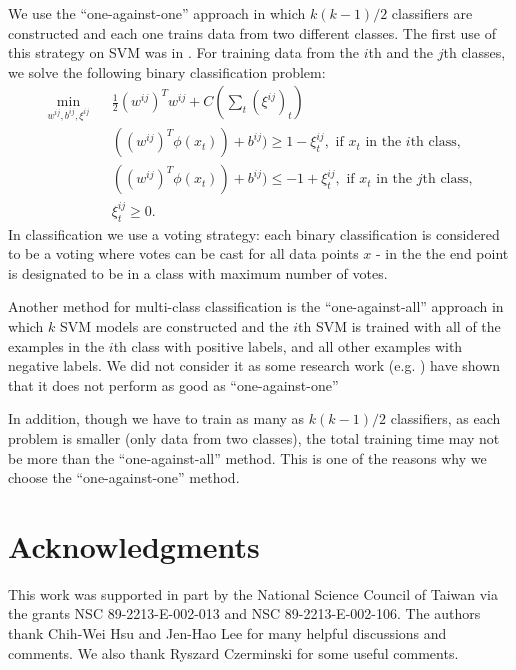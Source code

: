 \documentclass[11pt]{article}
\theoremstyle{break}
\begin{document}
We use the ``one-against-one'' approach
 in which 
$k(k-1)/2$ classifiers 
are constructed and
each one trains data from
two different classes.
The first use of this strategy
on SVM was in
.
For training data from the $i$th
 and the $j$th classes, we solve
the following binary classification
problem:
  \begin{eqnarray*}
\min_{w^{ij}, b^{ij}, \xi^{ij}} && 
\frac{1}{2}(w^{ij})^T w^{ij} + 
C(\sum_{t} (\xi^{ij})_t) 
\nonumber \\
&& ((w^{ij})^T \phi(x_t)) + b^{ij}) 
\geq 1 - \xi^{ij}_t,  
\mbox{ if $x_t$ in the $i$th class,} \nonumber \\
&& ((w^{ij})^T \phi(x_t)) + b^{ij}) 
\leq -1 + \xi^{ij}_t,  
\mbox{ if $x_t$ in the $j$th class,} \nonumber \\
&& \xi^{ij}_t \geq 0.
\nonumber
  \end{eqnarray*}
In classification we use a voting
strategy:
each binary classification
is considered to be a voting where votes can be cast for all data
points $x$ - in the the end point is designated to be in a class
with maximum number of votes.

Another method for multi-class classification
is the ``one-against-all''
approach in which $k$
SVM models are constructed and
the $i$th SVM is trained with
all of the examples
in the $i$th class with
positive labels,
and all other examples with negative labels.
We did not consider it
as some research work (e.g. )
have shown that it 
does not perform as good as ``one-against-one''

In addition, though we have to train 
as many as $k(k-1)/2$
classifiers,
as each problem is smaller
(only data from two classes), the total
training time may not be more than
the ``one-against-all'' method.
This is one of the reasons why we choose
the ``one-against-one'' method.


\section*{Acknowledgments}
This work was supported in part by
the National Science Council of Taiwan via the grants
NSC 89-2213-E-002-013
and NSC 89-2213-E-002-106.
The authors thank Chih-Wei Hsu and
Jen-Hao Lee
for many helpful discussions and comments.
We also thank Ryszard Czerminski for some
useful comments.



% 

\end{document}
